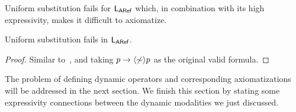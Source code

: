\medskip

Uniform substitution fails for $\mathsf{L_{ARef}}$ which, in combination with its high expressivity, makes it difficult to axiomatize.

\medskip

\begin{proposition}\label{prop:substitution-aref}
    Uniform substitution fails in $\mathsf{L_{ARef}}$.
\end{proposition}

\begin{proof}
Similar to~, and taking $p\to\langle \not\sim \rangle p$ as the original valid formula.
\end{proof}

The problem of defining dynamic operators and corresponding axiomatizations will be addressed in the next section. 
We finish this section by stating some expressivity connections between the
dynamic modalities we just discussed.

\medskip

